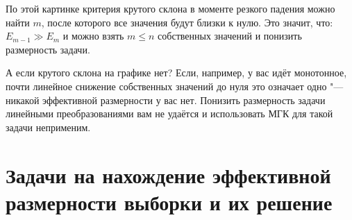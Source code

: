 По этой картинке критерия крутого склона в моменте резкого падения можно найти $m$, после которого все значения будут близки к нулю. Это значит, что: $E_{m-1} \gg E_m$ и можно взять $m \leq n$ собственных значений и понизить размерность задачи. \par

А если крутого склона на графике нет? Если, например, у вас идёт монотонное, почти линейное снижение собственных значений до нуля это означает одно "--- никакой эффективной размерности у вас нет. Понизить размерность задачи линейными преобразованиями вам не удаётся и использовать МГК для такой задачи неприменим.

\section{Задачи на нахождение эффективной размерности выборки и их решение}
